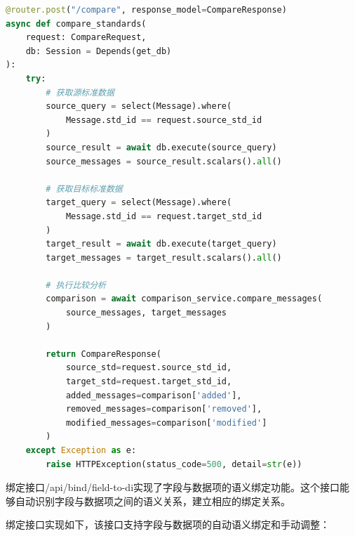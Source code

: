 \begin{lstlisting}[language=Python, label=fig:compare_api]
@router.post("/compare", response_model=CompareResponse)
async def compare_standards(
    request: CompareRequest,
    db: Session = Depends(get_db)
):
    try:
        # 获取源标准数据
        source_query = select(Message).where(
            Message.std_id == request.source_std_id
        )
        source_result = await db.execute(source_query)
        source_messages = source_result.scalars().all()
        
        # 获取目标标准数据
        target_query = select(Message).where(
            Message.std_id == request.target_std_id
        )
        target_result = await db.execute(target_query)
        target_messages = target_result.scalars().all()
        
        # 执行比较分析
        comparison = await comparison_service.compare_messages(
            source_messages, target_messages
        )
        
        return CompareResponse(
            source_std=request.source_std_id,
            target_std=request.target_std_id,
            added_messages=comparison['added'],
            removed_messages=comparison['removed'],
            modified_messages=comparison['modified']
        )
    except Exception as e:
        raise HTTPException(status_code=500, detail=str(e))
\end{lstlisting}

绑定接口/api/bind/field-to-di实现了字段与数据项的语义绑定功能。这个接口能够自动识别字段与数据项之间的语义关系，建立相应的绑定关系。

绑定接口实现如下，该接口支持字段与数据项的自动语义绑定和手动调整：

